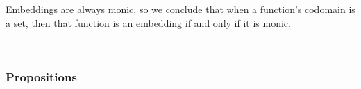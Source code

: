 Embeddings are always monic, so we conclude that when a function's codomain is a set, then that function is an embedding if and only if it is monic.
\ccpad
\begin{code}%
\>[0][@{}l@{\AgdaIndent{1}}]%
\>[1]\AgdaSpace{}%
\AgdaSymbol{:}%
\>[234I]\AgdaSymbol{(}\AgdaSpace{}%
\AgdaSymbol{:}\AgdaSpace{}%
\AgdaSpace{}%
\AgdaSpace{}%
\AgdaSymbol{)}\AgdaSpace{}%
\AgdaSpace{}%
\AgdaSpace{}%
\AgdaSpace{}%
\AgdaSpace{}%
\AgdaSpace{}%
\AgdaSpace{}%
\AgdaSpace{}%
\AgdaSpace{}%
\<%
\\
%
%
\>[1]\AgdaSpace{}%
\AgdaSpace{}%
\AgdaSpace{}%
\AgdaSymbol{=}\AgdaSpace{}%
\AgdaSymbol{(}\AgdaSpace{}%
\AgdaSymbol{)}\AgdaOperator{\AgdaInductiveConstructor{,}}\AgdaSpace{}%
\AgdaSymbol{(}\AgdaSpace{}%
\AgdaSpace{}%
\AgdaSymbol{)}\<%
\end{code}

\newcommand\proptype{\href{https://agda.readthedocs.io/en/v2.6.1.3/language/prop.html}{\af{Prop}}\xspace}

\subsubsection{Propositions}\label{propositions}

